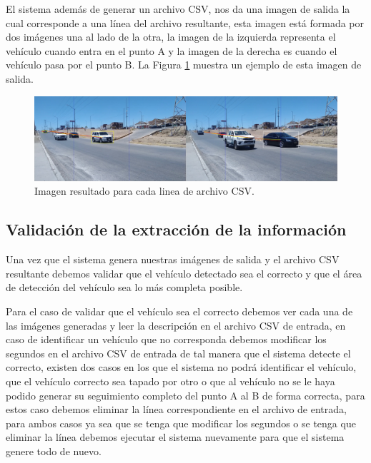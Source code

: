 El sistema además de generar un archivo CSV, nos da una imagen de salida la cual corresponde a una línea del archivo resultante, esta imagen está formada por dos imágenes una al lado de la otra, la imagen de la izquierda representa el vehículo cuando entra en el punto A y la imagen de la derecha es cuando el vehículo pasa por el punto B. La Figura \ref{fig:Completo} muestra un ejemplo de esta imagen de salida.

\begin{figure}[H]
    \centering
    \includegraphics[width=1\textwidth]{Metodologia/imgs/Completo.jpg}
    \caption{Imagen resultado para cada linea de archivo CSV.}
    \label{fig:Completo}
\end{figure}


\subsection{Validación de la extracción de la información}

Una vez que el sistema genera nuestras imágenes de salida y el archivo CSV resultante debemos validar que el vehículo detectado sea el correcto y que el área de detección del vehículo sea lo más completa posible.

Para el caso de validar que el vehículo sea el correcto debemos ver cada una de las imágenes generadas y leer la descripción en el archivo CSV de entrada, en caso de identificar un vehículo que no corresponda debemos modificar los segundos en el archivo CSV de entrada de tal manera que el sistema detecte el correcto, existen dos casos en los que el sistema no podrá identificar el vehículo, que el vehículo correcto sea tapado por otro o que al vehículo no se le haya podido generar su seguimiento completo del punto A al B de forma correcta, para estos caso debemos eliminar la línea correspondiente en el archivo de entrada, para ambos casos ya sea que se tenga que modificar los segundos o se tenga que eliminar la línea debemos ejecutar el sistema nuevamente para que el sistema genere todo de nuevo.

